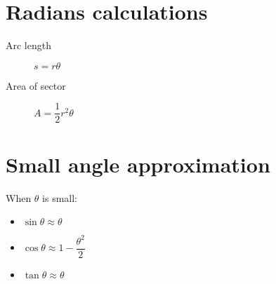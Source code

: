 \section{Radians calculations}
\begin{description}
    \item[Arc length] $s=r\theta$
    \item[Area of sector] $A=\dfrac{1}{2}r^2\theta$
\end{description}

\section{Small angle approximation}
When $\theta$ is small:
\begin{itemize}
    \item $\sin \theta \approx \theta$
    \item $\cos \theta \approx 1-\dfrac{\theta^2}{2}$
    \item $\tan \theta \approx \theta$
\end{itemize}

